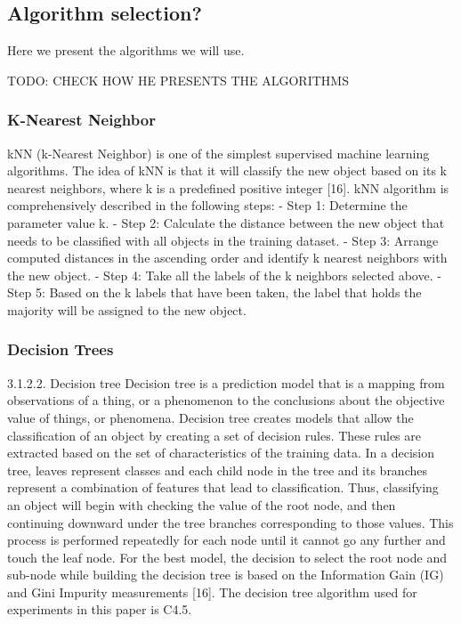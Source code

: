 \subsection{Algorithm selection?}
Here we present the algorithms we will use.

TODO: CHECK HOW HE PRESENTS THE ALGORITHMS

\subsubsection{K-Nearest Neighbor}
kNN (k-Nearest Neighbor) is one of the simplest supervised machine learning algorithms.
The idea of kNN is that it will classify the new object based on its k nearest neighbors, where k is a
predefined positive integer [16]. kNN algorithm is comprehensively described in the following steps:
- Step 1: Determine the parameter value k.
- Step 2: Calculate the distance between the new object that needs to be classified with all objects
in the training dataset.
- Step 3: Arrange computed distances in the ascending order and identify k nearest neighbors with
the new object.
- Step 4: Take all the labels of the k neighbors selected above.
- Step 5: Based on the k labels that have been taken, the label that holds the majority will be
assigned to the new object.

\subsubsection{Decision Trees}
3.1.2.2. Decision tree
Decision tree is a prediction model that is a mapping from observations of a thing, or a
phenomenon to the conclusions about the objective value of things, or phenomena. Decision tree
creates models that allow the classification of an object by creating a set of decision rules. These rules
are extracted based on the set of characteristics of the training data. In a decision tree, leaves represent
classes and each child node in the tree and its branches represent a combination of features that
lead to classification. Thus, classifying an object will begin with checking the value of the root node,
and then continuing downward under the tree branches corresponding to those values. This process is
performed repeatedly for each node until it cannot go any further and touch the leaf node. For the best
model, the decision to select the root node and sub-node while building the decision tree is based on
the Information Gain (IG) and Gini Impurity measurements [16]. The decision tree algorithm used for
experiments in this paper is C4.5.

